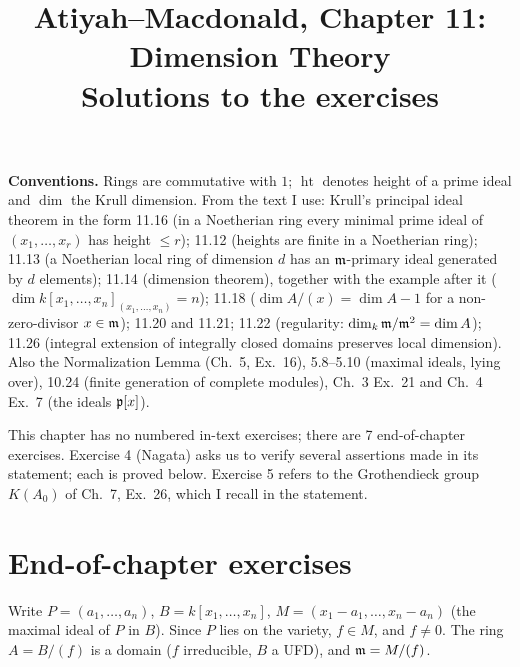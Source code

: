 \documentclass[11pt]{article}
\title{Atiyah--Macdonald, Chapter 11: Dimension Theory\\[2pt]\large Solutions to the exercises}
\author{}
\date{}
\begin{document}
\maketitle
\noindent\textbf{Conventions.} Rings are commutative with $1$; $\operatorname{ht}$ denotes height of a prime ideal and $\dim$ the Krull dimension. From the text I use: Krull's principal ideal theorem in the form 11.16 (in a Noetherian ring every minimal prime ideal of $(x_1,\dots,x_r)$ has height $\le r$); 11.12 (heights are finite in a Noetherian ring); 11.13 (a Noetherian local ring of dimension $d$ has an $\mathfrak m$-primary ideal generated by $d$ elements); 11.14 (dimension theorem), together with the example after it ($\dim k[x_1,\dots,x_n]_{(x_1,\dots,x_n)}=n$); 11.18 ($\dim A/(x)=\dim A-1$ for a non-zero-divisor $x\in\mathfrak m$); 11.20 and 11.21; 11.22 (regularity: $\dim_k\mathfrak m/\mathfrak m^2=\dim A$); 11.26 (integral extension of integrally closed domains preserves local dimension). Also the Normalization Lemma (Ch.~5, Ex.~16), 5.8--5.10 (maximal ideals, lying over), 10.24 (finite generation of complete modules), Ch.~3 Ex.~21 and Ch.~4 Ex.~7 (the ideals $\mathfrak p[x]$).

This chapter has no numbered in-text exercises; there are 7 end-of-chapter exercises. Exercise 4 (Nagata) asks us to verify several assertions made in its statement; each is proved below. Exercise 5 refers to the Grothendieck group $K(A_0)$ of Ch.~7, Ex.~26, which I recall in the statement.

\section*{End-of-chapter exercises}

\pf
Write $P=(a_1,\dots,a_n)$, $B=k[x_1,\dots,x_n]$, $M=(x_1-a_1,\dots,x_n-a_n)$ (the maximal ideal of $P$ in $B$). Since $P$ lies on the variety, $f\in M$, and $f\ne0$. The ring $A=B/(f)$ is a domain ($f$ irreducible, $B$ a UFD), and $\mathfrak m=M/(f)$.
\end{document}
